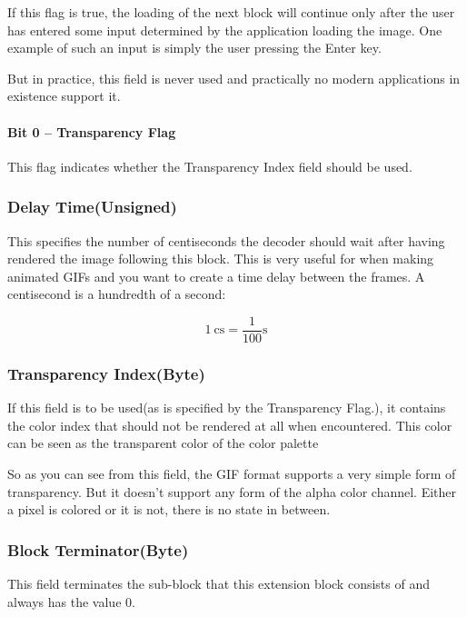 If this flag is true, the loading of the next block will continue only
after the user has entered some input determined by the application
loading the image. One example of such an input is simply the user
pressing the Enter key.

But in practice, this field is never used and practically no modern
applications in existence support it.

\paragraph{Bit 0 -- Transparency Flag }

This flag indicates whether the Transparency Index field should be
used.

\subsubsection{Delay Time(Unsigned)}

This specifies the number of centiseconds the decoder should wait
after having rendered the image following this block. This is very
useful for when making animated GIFs and you want to create a time
delay between the frames. A centisecond is a hundredth of a second:

\begin{equation*}
  \SI{1}{\centi\second} = \frac{1}{100}\si{\second}
\end{equation*}

\subsubsection{Transparency Index(Byte)}

If this field is to be used(as is specified by the Transparency
Flag.), it contains the color index that should not be rendered at all
when encountered. This color can be seen as the transparent color of
the color palette

So as you can see from this field, the GIF format supports a very
simple form of transparency. But it doesn't support any form of the
alpha color channel. Either a pixel is colored or it is not, there is
no state in between.

\subsubsection{Block Terminator(Byte)}

This field terminates the sub-block that this extension block
consists of and always has the value $0$.

